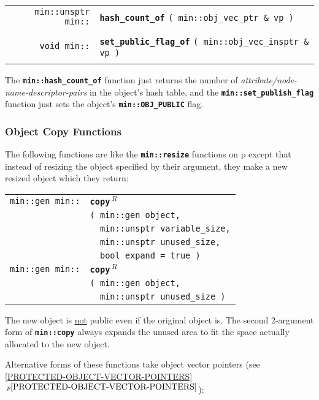 \documentclass[12pt]{article}
\makeatletter
\newcommand{\TT}[1]{{\tt \bfseries #1}}
\newcommand{\ttindex}[1]{\index{#1@{\tt #1}}}
\newcommand{\itemref}[1]{\ref{#1}$\,^{p\pageref{#1}}$}
\newcommand{\pagref}[1]{p\pageref{#1}}
\newcommand{\EOL}{\penalty \exhyphenpenalty}
\newenvironment{indpar}[1][0.3in]%
	{\begin{list}{}%
		     {\setlength{\itemsep}{0in}%
		      \setlength{\topsep}{0in}%
		      \setlength{\parsep}{1ex}%
		      \setlength{\labelwidth}{#1}%
		      \setlength{\leftmargin}{#1}%
		      \addtolength{\leftmargin}{\labelsep}}%
	 \item}%
	{\end{list}}
\newcommand{\LABEL}[1]{\label{#1}}
\newlength{\ARGBREAKLENGTH}
\newcommand{\ARGBREAK}[1][\ARGBREAKLENGTH]{\\&\hspace*{#1}}
\newcommand{\MINKEY}[1]%
	   {\TT{#1}\ttindex{min::#1}\ttindex{#1}}
\newcommand{\REL}{$\,^R$}
\makeatother
\begin{document}
\begin{indpar}\begin{tabular}{r@{}l}
\verb|min::unsptr min::| & \MINKEY{hash\_count\_of}
    \verb|( min::obj_vec_ptr & vp )| \\
\LABEL{MIN::HASH_COUNT_OF} \\
\verb|void min::| & \MINKEY{set\_public\_flag\_of}
    \verb|( min::obj_vec_insptr & vp )| \\
\LABEL{MIN::SET_PUBLIC_FLAG_OF} \\
\end{tabular}\end{indpar}

The \TT{min::hash\_count\_of} function just returns the number of
{\em attribute/node-name-descrip\-tor-pairs} in the object's hash table,
and the \TT{min::\EOL set\_\EOL publish\_\EOL flag} function just sets
the object's \TT{min::\EOL OBJ\_\EOL PUBLIC} flag.

\subsubsection{Object Copy Functions}
\label{OBJECT-COPY-FUNCTIONS}

The following functions are like the \TT{min::\EOL resize} functions on
\pagref{MIN::RESIZE} except that instead of resizing the object specified
by their argument, they make a new resized object which they return:

\begin{indpar}\begin{tabular}{r@{}l}
\verb|min::gen min::| & \MINKEY{copy\REL}\ARGBREAK
    \verb|( min::gen object,|\ARGBREAK
    \verb|  min::unsptr variable_size,|\ARGBREAK
    \verb|  min::unsptr unused_size,|\ARGBREAK
    \verb|  bool expand = true )|
\LABEL{MIN::COPY} \\
\verb|min::gen min::| & \MINKEY{copy\REL}\ARGBREAK
    \verb|( min::gen object,|\ARGBREAK
    \verb|  min::unsptr unused_size )|
\LABEL{MIN::COPY_UNUSED} \\
\end{tabular}\end{indpar}

The new object is \underline{not} public even if the original
object is.  The second 2-argument form of \TT{min::\EOL copy}
always expands the unused area to fit the space actually allocated
to the new object.

Alternative forms of these functions take object
vector pointers (see \itemref{PROTECTED-OBJECT-VECTOR-POINTERS}):
\end{document}
